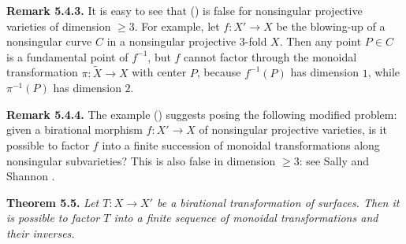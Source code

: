 {\medskip
\noindent\hypertarget{result-V-5.4.3}{}\textbf{Remark 5.4.3.} It is easy to see that () is false for nonsingular projective varieties of dimension $\ge3$. For example, let $f\colon X'\to X$ be the blowing-up of a nonsingular curve $C$ in a nonsingular projective $3$-fold $X$. Then any point $P\in C$ is a fundamental point of $f^{-1}$, but $f$ cannot factor through the monoidal transformation $\pi\colon\widetilde X\to X$ with center $P$, because $f^{-1}(P)$ has dimension $1$, while $\pi^{-1}(P)$ has dimension $2$.

\medskip
\noindent\hypertarget{result-V-5.4.4}{}\textbf{Remark 5.4.4.} The example () suggests posing the following modified problem: given a birational morphism $f\colon X'\to X$ of nonsingular projective varieties, is it possible to factor $f$ into a finite succession of monoidal transformations along nonsingular subvarieties? This is also false in dimension $\ge3$: see Sally  and Shannon .

\medskip
\noindent\hypertarget{result-V-5.5}{}\textbf{Theorem 5.5.} \emph{Let $T\colon X\to X'$ be a birational transformation of surfaces. Then it is possible to factor $T$ into a finite sequence of monoidal transformations and their inverses.}}
